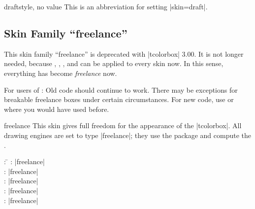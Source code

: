 \begin{docTcbKey}{draft}{}{style, no value}
  This is an abbreviation for setting |skin=draft|.
\end{docTcbKey}


\begin{dispExample}
\end{dispExample}



\begin{dispExample}
\vspace*{3mm}
\begin{tcolorbox}[draft,title=A colored box with the ``draft'' skin]
\lipsum[1-3]
\tcblower
\lipsum[4-6]
\end{tcolorbox}
\end{dispExample}



\clearpage
\subsection{Skin Family \enquote{freelance}}
\begin{marker}
This skin family \enquote{freelance} is deprecated with |tcolorbox| 3.00.
It is not longer needed, because
,
,
, and
can be applied to every skin now. In this sense, everything has become
\emph{freelance} now.\par
For users of : Old code should continue to work. There may be
exceptions for breakable freelance boxes under certain circumstances.
For new code, use  or  where
you would have used  before.
\end{marker}

\begin{docSkin}{freelance}
  This skin gives full freedom for the appearance of the |tcolorbox|.
  All drawing engines are set to type |freelance|; they use the 
  package and compute the .
\begin{tcolorbox}[skintable=freelance]
  \begin{tabbing}
    : \=\kill
    :           \> |freelance|\\
    : \> |freelance|\\ 
    :        \> |freelance|\\
    :    \> |freelance|\\
    :           \> |freelance|
  \end{tabbing}
\end{tcolorbox}
\end{docSkin}


